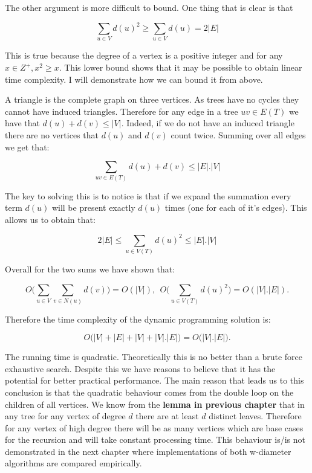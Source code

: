 The other argument is more difficult to bound. One thing that is clear is that 

$$ \sum_{u \in V}{d(u)^2} \ge \sum_{u \in V}{d(u)} = 2|E|$$

This is true because the degree of a vertex is a positive integer and for any $x \in Z^+, x^2 \ge x$. This lower bound shows that it may be possible to obtain linear time complexity. I will demonstrate how we can bound it from above. 

A triangle is the complete graph on three vertices. As trees have no cycles they cannot have induced triangles. Therefore for any edge in a tree $uv \in E(T)$ we have that $d(u) + d(v) \le |V|$. Indeed, if we do not have an induced triangle there are no vertices that $d(u)$ and $d(v)$ count twice. Summing over all edges we get that:

$$ \sum_{uv \in E(T)}{d(u) + d(v)} \le |E|.|V| $$

The key to solving this is to notice is that if we expand the summation every term $d(u)$ will be present exactly $d(u)$ times (one for each of it's edges). This allows us to obtain that:

$$ 2|E| \le \sum_{u \in V(T)}{d(u)^2} \le |E|.|V| $$

Overall for the two sums we have shown that:

$$ O\bigg( \sum_{u \in V}{\sum_{v \in N(u)}{d(v)}} \bigg) = O(|V|)  , ~~ O\bigg( \sum_{u \in V(T)}{d(u)^2} \bigg) = O(|V|.|E|).$$

Therefore the time complexity of the dynamic programming solution is:

$$ O\big( |V| + |E| + |V| + |V|.|E|  \big) = O\big(|V|.|E|\big).$$


The running time is quadratic. Theoretically this is no better than a brute force exhaustive search. Despite this we have reasons to believe that it has the potential for better practical performance. The main reason that leads us to this conclusion is that the quadratic behaviour comes from the double loop on the children of all vertices. We know from the \textbf{lemma in previous chapter}  that in any tree for any vertex of degree $d$ there are at least $d$ distinct leaves. Therefore for any vertex of high degree there will be as many vertices which are base cases for the recursion and will take constant processing time. This behaviour is/is not demonstrated in the next chapter where implementations of both w-diameter algorithms are compared empirically.


\cite{parikh1980adaptive}
